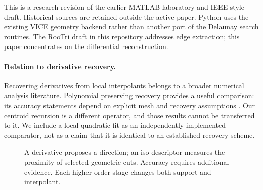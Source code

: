 This is a research revision of the earlier MATLAB laboratory and IEEE-style
draft. Historical sources are retained outside the active paper. Python
uses the existing VICE geometry backend rather than another port of the
Delaunay search routines. The RooTri draft in this repository addresses edge
extraction; this paper concentrates on the differential reconstruction.

\paragraph{Relation to derivative recovery.}
Recovering derivatives from local interpolants belongs to a broader numerical
analysis literature. Polynomial preserving recovery provides a useful
comparison: its accuracy statements depend on explicit mesh and recovery
assumptions \cite{naga2004}. Our centroid recursion is a different operator,
and those results cannot be transferred to it. We include a local quadratic
fit as an independently implemented comparator, not as a claim that it is
identical to an established recovery scheme.

\begin{figure}[htbp]
\centering
\caption{A derivative proposes a direction; an iso descriptor measures the
proximity of selected geometric cuts. Accuracy requires additional evidence.
Each higher-order stage changes both support and interpolant.}
\label{fig:pipeline}
\end{figure}
